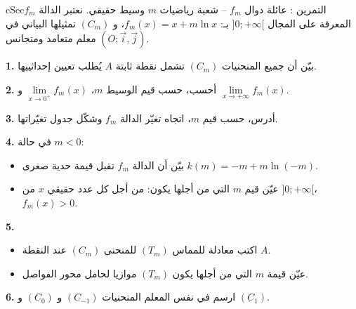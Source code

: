 \documentclass[12pt,a4paper]{article}
\newenvironment{BOX}[2]{\begin{otherlanguage}{english}\begin{arbox}{#1}{#2}}{\end{arbox}\end{otherlanguage}}
\newcounter{exo}
\newenvironment{tamrin}[1]{\stepcounter{exo}\begin{BOX}{cSec}{التمرين \theexo: #1}}{\end{BOX}}
\newenvironment{sq}{\begin{itemize}[leftmargin=2.4em,itemsep=3pt]}{\end{itemize}}
\newcommand{\qa}{\item[(أ)]}\newcommand{\qb}{\item[(ب)]}\newcommand{\qc}{\item[(جـ)]}\newcommand{\qd}{\item[(د)]}\newcommand{\qe}{\item[(هـ)]}
\newcommand{\QQ}[1]{\par\smallskip\textbf{#1.} }
\begin{document}
\begin{tamrin}{عائلة دوال $f_m$ -- شعبة رياضيات}
$m$ وسيط حقيقي. نعتبر الدالة $f_m$ المعرفة على المجال $]0;+\infty[$ بـ: $f_m(x)=x+m\ln x$، و $(C_m)$ تمثيلها البياني في معلم متعامد ومتجانس $(O;\vec i,\vec j)$.
\QQ{1} بيّن أن جميع المنحنيات $(C_m)$ تشمل نقطة ثابتة $A$ يُطلب تعيين إحداثييها.
\QQ{2} أحسب، حسب قيم الوسيط $m$، $\lim\limits_{x\to 0^{+}}f_m(x)$ و $\lim\limits_{x\to +\infty}f_m(x)$.
\QQ{3} أدرس، حسب قيم $m$، اتجاه تغيّر الدالة $f_m$ وشكّل جدول تغيّراتها.
\QQ{4} في حالة $m<0$:
\begin{sq}
\qa بيّن أن الدالة $f_m$ تقبل قيمة حدية صغرى $k(m)=-m+m\ln(-m)$.
\qb عيّن قيم $m$ التي من أجلها يكون: من أجل كل عدد حقيقي $x$ من $]0;+\infty[$، $f_m(x)>0$.
\end{sq}
\QQ{5}
\begin{sq}
\qa اكتب معادلة للمماس $(T_m)$ للمنحنى $(C_m)$ عند النقطة $A$.
\qb عيّن قيمة $m$ التي من أجلها يكون $(T_m)$ موازيا لحامل محور الفواصل.
\end{sq}
\QQ{6} ارسم في نفس المعلم المنحنيات $(C_{-1})$ و $(C_{0})$ و $(C_{1})$.
\end{tamrin}
\end{document}

